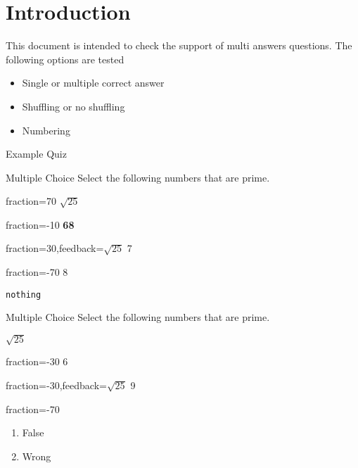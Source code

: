 \documentclass{article}
\begin{document}
\section*{Introduction}

This document is intended to check the support of multi answers questions. The 
following options are tested
\begin{itemize}
	\item Single or multiple correct answer
	\item Shuffling or no shuffling
	\item Numbering
\end{itemize}

\begin{quiz}[numbering=none]{Example Quiz}

\renewcommand\do[1]{
\begin{multi}[numbering=#1]{Multiple Choice}
Text
\item* A
\item B
\item C
\end{multi}
}

\begin{multi}[multiple,feedback={abc\\def 
$\sqrt{2}$}]{Multiple Choice}
Select the following numbers that are prime.
\item[fraction=70] $\sqrt{25}$
\item[fraction=-10] \textbf{68}
\item[fraction=30,feedback={$\sqrt{25}$}] 7
\item[fraction=-70] 8
\item \texttt{nothing}
\end{multi}

\begin{multi}[shuffle,feedback={abc\\def $\sqrt{2}$}]{Multiple 
Choice}
Select the following numbers that are prime.
\item* $\sqrt{25}$
\item[fraction=-30] 6
\item[fraction=-30,feedback={$\sqrt{25}$}] 9
\item[fraction=-70] \begin{enumerate}
\item False
\item Wrong
\end{enumerate}
\end{multi}

\end{quiz}
\end{document}
